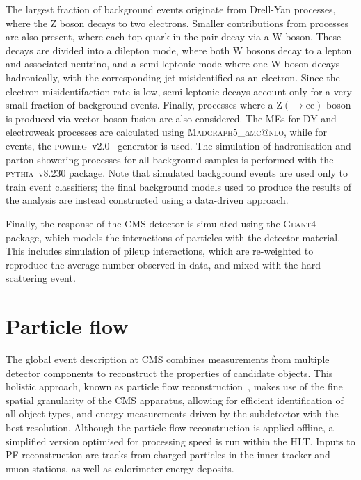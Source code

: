 The largest fraction of background events originate from Drell-Yan processes, where the $\mathrm{Z}$ boson decays to two electrons. Smaller contributions from \ttbar processes are also present, where each top quark in the pair decay via a $\mathrm{W}$ boson. These decays are divided into a dilepton mode, where both $\mathrm{W}$ bosons decay to a lepton and associated neutrino, and a semi-leptonic mode where one $\mathrm{W}$ boson decays hadronically, with the corresponding jet misidentified as an electron. Since the electron misidentifaction rate is low, semi-leptonic \ttbar decays account only for a very small fraction of background events. Finally, processes where a $\mathrm{Z}(\rightarrow\mathrm{ee})$ boson is produced via vector boson fusion are also considered. The MEs for DY and electroweak \Zee processes are calculated using \textsc{Madgraph5\_}a\textsc{mc@nlo}, while for \ttbar events, the \textsc{powheg}~v2.0~\cite{powheg1,powheg2,powheg3,powheg_ttbar} generator is used.
The simulation of hadronisation and parton showering processes for all background samples is performed with the \textsc{pythia}~v8.230 package.
Note that simulated background events are used only to train event classifiers; the final background models used to produce the results of the analysis are instead constructed using a data-driven approach.

Finally, the response of the CMS detector is simulated using the \textsc{Geant4}~\cite{geant4} package, which models the interactions of particles with the detector material. This includes simulation of pileup interactions, which are re-weighted to reproduce the average number observed in data, and mixed with the hard scattering event.

\section{Particle flow}
\label{section:PF}

The global event description at CMS combines measurements from multiple detector components to reconstruct the properties of candidate objects. This holistic approach, known as particle flow reconstruction~\cite{particle_flow}, makes use of the fine spatial granularity of the CMS apparatus, allowing for efficient identification of all object types, and energy measurements driven by the subdetector with the best resolution. Although the particle flow reconstruction is applied offline, a simplified version optimised for processing speed is run within the HLT. Inputs to PF reconstruction are tracks from charged particles in the inner tracker and muon stations, as well as calorimeter energy deposits.

